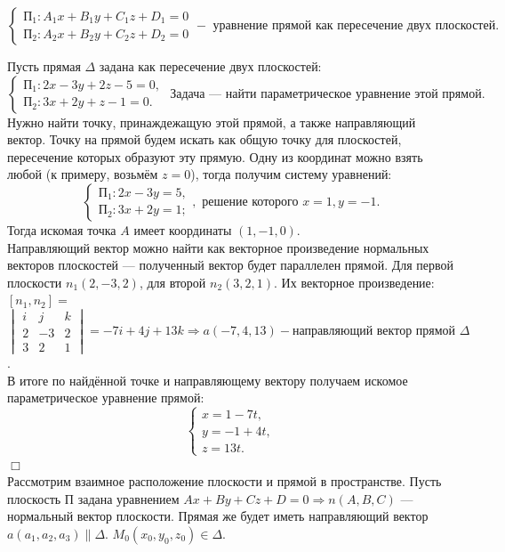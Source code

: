 \documentclass[a4paper, 12pt]{report}
\newenvironment{examp} %
{\par\noindent{\textbf{\textsc{Пример:}}}} %
{\hfill$\scriptstyle\Box$}
\begin{document}
	\begin{equation*}
		\begin{cases}
			\text{П}_1: A_1x + B_1y + C_1z + D_1 = 0 \\
			\text{П}_2: A_2x + B_2y + C_2z + D_2 = 0 
		\end{cases} - \textbf{ уравнение прямой как пересечение двух плоскостей.}
	\end{equation*} 
	\begin{examp}
		 Пусть прямая $\Delta$ задана как пересечение двух плоскостей:
		\begin{equation*}
			\begin{cases}
				\text{П}_1: 2x - 3y + 2z - 5 = 0, \\
				\text{П}_2: 3x + 2y + z - 1 = 0.
			\end{cases} \text{ Задача --- найти параметрическое уравнение этой прямой.}
		\end{equation*} 
		Нужно найти точку, принаждежащую этой прямой, а также направляющий вектор. Точку на прямой будем искать как общую точку для плоскостей, пересечение которых образуют эту прямую. Одну из координат можно взять любой (к примеру, возьмём $z = 0$), тогда получим систему уравнений: 
		\begin{equation*}
			\begin{cases}
				\text{П}_1: 2x - 3y = 5, \\
				\text{П}_2: 3x + 2y = 1; 
			\end{cases}, \text{ решение которого } x = 1, y = -1.
		\end{equation*}
		Тогда искомая точка $A$ имеет координаты $(1, -1, 0)$.\\
		Направляющий вектор можно найти как векторное произведение нормальных векторов плоскостей --- полученный вектор будет параллелен прямой. Для первой плоскости $n_1(2, -3, 2)$, для второй $n_2(3, 2, 1)$. Их векторное произведение: $[n_1, n_2] =$
		$\begin{vmatrix}
			i& j & k \\
			2 & -3 & 2 \\
			3 & 2 & 1
		\end{vmatrix} = -7i + 4j + 13k \Rightarrow a(-7, 4, 13) - \text{направляющий вектор прямой } \Delta$.\\
		В итоге по найдённой точке и направляющему вектору получаем искомое параметрическое уравнение прямой:
		$$\begin{cases}
			x = 1 - 7t, \\
			y = -1 + 4t, \\
			z = 13t.
		\end{cases}$$
	\end{examp}\\
	Рассмотрим взаимное расположение плоскости и прямой в пространстве. Пусть плоскость П задана уравнением $Ax + By + Cz + D = 0 \Rightarrow n(A, B, C)$ --- нормальный вектор плоскости. Прямая же будет иметь направляющий вектор $a(a_1, a_2, a_3) \parallel \Delta$. $M_0(x_0, y_0, z_0) \in \Delta$.
	
\end{document}
